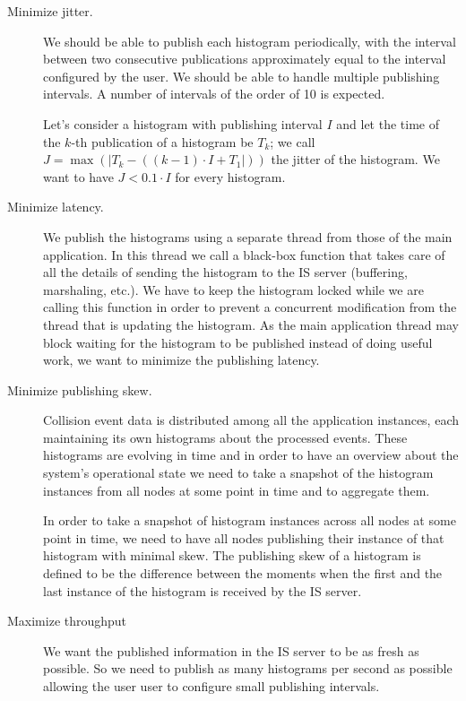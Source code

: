 \begin{description}
\item[Minimize jitter.]

We should be able to publish each histogram periodically, with the interval between two consecutive publications approximately equal to the interval configured by the user. We should be able to handle multiple publishing intervals. A number of intervals of the order of 10 is expected.

Let's consider a histogram with publishing interval $I$ and let the time of the $k$-th publication of a histogram be $T_k$; we call $J=\max(\lvert T_k-((k-1) \cdot I+T_1\rvert))$ the jitter of the histogram. We want to have $J < 0.1\cdot I$ for every histogram.

\item[Minimize latency.]

We publish the histograms using a separate thread from those of the main application. In this thread we call a black-box function that takes care of all the details of sending the histogram to the IS server (buffering, marshaling, etc.). We have to keep the histogram locked while we are calling this function in order to prevent a concurrent modification from the thread that is updating the histogram. As the main application thread may block waiting for the histogram to be published instead of doing useful work, we want to minimize the publishing latency.

\item [Minimize publishing skew.]

Collision event data is distributed among all the application instances, each maintaining its own histograms about the processed events. These histograms are evolving in time and in order to have an overview about the system's operational state we need to take a snapshot of the histogram instances from all nodes at some point in time and to aggregate them.

In order to take a snapshot of histogram instances across all nodes at some point in time, we need to have all nodes publishing their instance of that histogram with minimal skew. The publishing skew of a histogram is defined to be the difference between the moments when the first and the last instance of the histogram is received by the IS server.  

\item [Maximize throughput]

We want the published information in the IS server to be as fresh as possible. So we need to publish as many histograms per second as possible allowing the user user to configure small publishing intervals.


\end{description}
